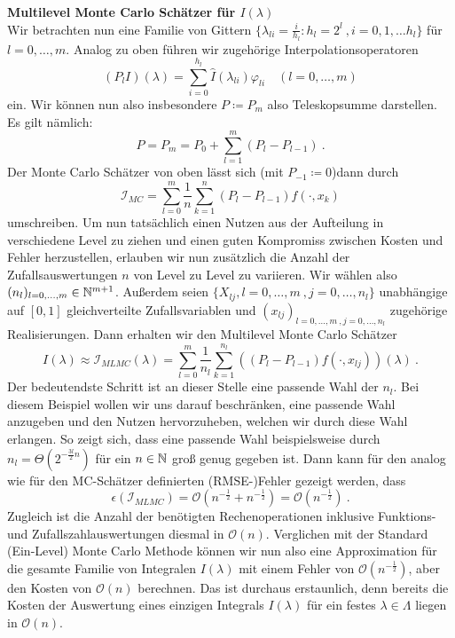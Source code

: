 \begin{Beispiel}
	\textbf{Multilevel Monte Carlo Schätzer für $ I(\lambda) $}\\
	Wir betrachten nun eine Familie von Gittern $ \{ \lambda_{li} = \frac{i}{h_l} : h_l = 2^l \ , i=0,1,\dots h_l \} $ für $ l = 0,\dots,m $.
	Analog zu oben führen wir zugehörige Interpolationsoperatoren 
	\[
	 (P_l I)(\lambda) = \sum_{i=0}^{h_l} \hat{I}(\lambda_{li}) \varphi_{li} \quad (l = 0,\dots,m)
	 \]
	 ein. Wir können nun also insbesondere $ P \coloneqq P_m $ also Teleskopsumme darstellen. Es gilt nämlich:
	 \[
	 	P = P_m = P_0 + \sum_{l=1}^{m} (P_l-P_{l-1}) \ .
	 \]
	 Der Monte Carlo Schätzer von oben lässt sich (mit $ P_{-1} \coloneqq 0 $)dann durch 
	 \[	
	 \mathcal{I}_{MC} = \sum\limits_{l=0}^{m} \frac{1}{n} \sum\limits_{k=1}^{n} (P_l-P_{l-1})f(\cdot,x_k)	
	 \]
	  umschreiben. Um nun tatsächlich einen Nutzen aus der Aufteilung in verschiedene Level zu ziehen und einen guten Kompromiss zwischen Kosten und Fehler herzustellen, erlauben wir nun zusätzlich die Anzahl der Zufallsauswertungen $ n $ von Level zu Level zu variieren. 
	  Wir wählen also $ (n_l)_{l=0,\dots,m} \in \mathbb{N}^{m+1}  $.  Außerdem seien $ \{ X_{lj} , l=0,\dots,m \ , j= 0,\dots,n_l\} $ unabhängige auf $ [0,1] $ gleichverteilte Zufallsvariablen und $ (x_{lj})_{l=0,\dots,m \ ,j=0,\dots,n_l} $ zugehörige Realisierungen.
	  Dann erhalten wir den Multilevel Monte Carlo Schätzer 
	  \[
	   I(\lambda) \approx \mathcal{I}_{MLMC}(\lambda) = \sum_{l=0}^{m} \frac{1}{n_l} \sum_{k=1}^{n_l} ((P_l - P_{l-1}) f(\cdot,x_{lj}))(\lambda) \ .
	  \]
	  Der bedeutendste Schritt ist an dieser Stelle eine passende Wahl der $ n_l $. Bei diesem Beispiel wollen wir uns darauf beschränken, eine passende Wahl anzugeben und den Nutzen hervorzuheben, welchen wir durch diese Wahl erlangen. So zeigt sich, dass eine passende Wahl beispielsweise durch $ n_l = \Theta(2^{-\frac{3l}{2}n})$ für ein $ n \in \mathbb{N} $ groß genug gegeben ist. 
	  Dann kann für den analog wie für den MC-Schätzer definierten (RMSE-)Fehler gezeigt werden, dass 
	  \[
	  	\epsilon(\mathcal{I}_{MLMC}) = \mathcal{O}(n^{-\frac{1}{2}} + n^{-\frac{1}{2}}) = \mathcal{O}(n^{-\frac{1}{2}}) \ .
	  \]
	  Zugleich ist die Anzahl der benötigten Rechenoperationen inklusive Funktions- und Zufallszahlauswertungen diesmal in $ \mathcal{O}(n) $.
	  Verglichen mit der Standard (Ein-Level) Monte Carlo Methode können wir nun also eine Approximation für die gesamte Familie von Integralen $ I(\lambda) $ mit einem Fehler von $ \mathcal{O}(n^{-\frac{1}{2}}) $, aber den Kosten von $ \mathcal{O}(n) $  berechnen. Das ist durchaus erstaunlich, denn bereits die Kosten der Auswertung eines einzigen Integrals $ I(\lambda) $ für ein festes $ \lambda \in \Lambda $ liegen in $ \mathcal{O}(n) $. 
\end{Beispiel}

